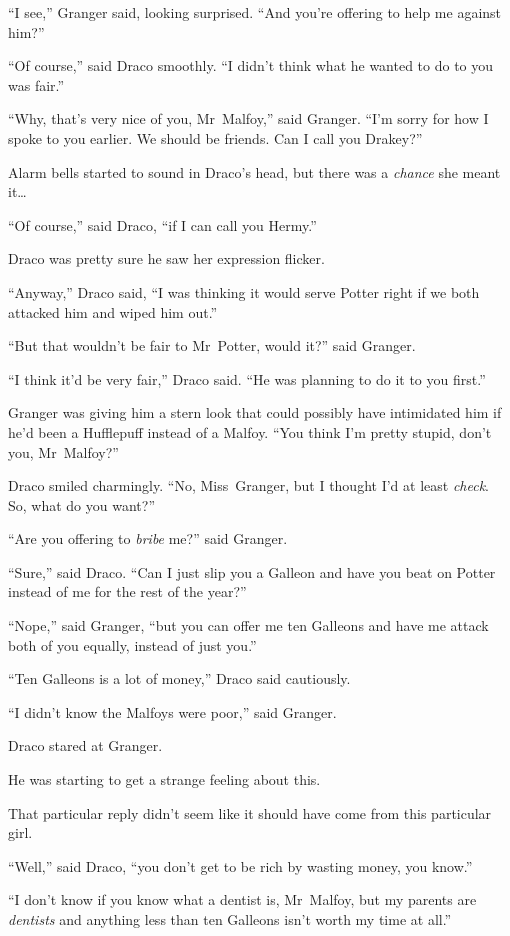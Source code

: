 “I see,” Granger said, looking surprised.
“And you’re offering to help me against him?”

“Of course,” said Draco smoothly.
“I didn’t think what he wanted to do to you was fair.”

“Why, that’s very nice of you, Mr~Malfoy,” said Granger.
“I’m sorry for how I spoke to you earlier. We should be friends. Can I call you Drakey?”

Alarm bells started to sound in Draco’s head, but there was a \emph{chance} she meant it…

“Of course,” said Draco, “if I can call you Hermy.”

Draco was pretty sure he saw her expression flicker.

“Anyway,” Draco said,
“I was thinking it would serve Potter right if we both attacked him and wiped him out.”

“But that wouldn’t be fair to Mr~Potter, would it?” said Granger.

“I think it’d be very fair,” Draco said.
“He was planning to do it to you first.”

Granger was giving him a stern look that could possibly have intimidated him if he’d been a Hufflepuff instead of a Malfoy.
“You think I’m pretty stupid, don’t you, Mr~Malfoy?”

Draco smiled charmingly.
“No, Miss~Granger, but I thought I’d at least \emph{check}. So, what do you want?”

“Are you offering to \emph{bribe} me?” said Granger.

“Sure,” said Draco.
“Can I just slip you a Galleon and have you beat on Potter instead of me for the rest of the year?”

“Nope,” said Granger, “but you can offer me ten Galleons and have me attack both of you equally, instead of just you.”

“Ten Galleons is a lot of money,” Draco said cautiously.

“I didn’t know the Malfoys were poor,” said Granger.

Draco stared at Granger.

He was starting to get a strange feeling about this.

That particular reply didn’t seem like it should have come from this particular girl.

“Well,” said Draco, “you don’t get to be rich by wasting money, you know.”

“I don’t know if you know what a dentist is, Mr~Malfoy, but my parents are \emph{dentists} and anything less than ten Galleons isn’t worth my time at all.”

